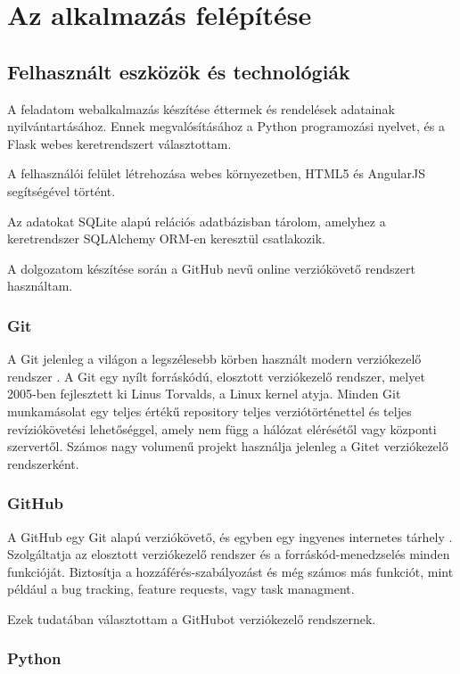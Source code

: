 \chapter{Az alkalmazás felépítése}

\section{Felhasznált eszközök és technológiák}

A feladatom webalkalmazás készítése éttermek és rendelések adatainak nyilvántartásához. Ennek megvalósításához a Python programozási nyelvet, és a Flask webes keretrendszert választottam.

A felhasználói felület létrehozása webes környezetben, HTML5 és AngularJS segítségével történt.

Az adatokat SQLite alapú relációs adatbázisban tárolom, amelyhez a keretrendszer SQLAlchemy ORM-en keresztül csatlakozik. 

A dolgozatom készítése során a GitHub nevű online verziókövető rendszert használtam.

\subsection{Git}

A Git jelenleg a világon a legszélesebb körben használt modern verziókezelő rendszer \cite{git}. A Git egy nyílt forráskódú, elosztott verziókezelő rendszer, melyet 2005-ben fejlesztett ki Linus Torvalds, a Linux kernel atyja. Minden Git munkamásolat egy teljes értékű repository teljes verziótörténettel és teljes revíziókövetési lehetőséggel, amely nem függ a hálózat elérésétől vagy központi szervertől. Számos nagy volumenű projekt használja jelenleg a Gitet verziókezelő rendszerként.

\subsection{GitHub}

A GitHub egy Git alapú verziókövető, és egyben egy ingyenes internetes tárhely \cite{gitHub}. Szolgáltatja az elosztott verziókezelő rendszer és a forráskód-menedzselés minden funkcióját. Biztosítja a hozzáférés-szabályozást és még számos más funkciót, mint például a bug tracking, feature requests, vagy task managment.

Ezek tudatában választottam a GitHubot verziókezelő rendszernek.

\subsection{Python}

